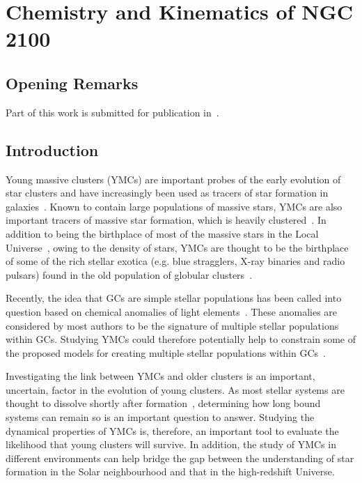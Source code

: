 \chapter{Chemistry and Kinematics of NGC\,2100}\label{ch:ngc2100}

\section{Opening Remarks} %
\label{sec:opening_remarks}

Part of this work is submitted for publication in~\cite{2016arXiv160202702P}.

\section{Introduction} %
\label{sec:introduction}

Young massive clusters (YMCs\footnotemark) are important probes of the early evolution of star clusters and have increasingly been used as tracers of star formation in galaxies~\citep[e.g.][]{1995AJ....109..960W,1997AJ....114.2381M,1999AJ....118..752Z}.
Known to contain large populations of massive stars, YMCs are also important tracers of massive star formation, which is heavily clustered~\citep{2003ARA&A..41...57L,2005A&A...437..247D,2007MNRAS.380.1271P}.
In addition to being the birthplace of most of the massive stars in the Local Universe~\citep[$>200\,$M$_{\odot}$ stars in R136;][]{2010MNRAS.408..731C}, owing to the density of stars, YMCs are thought to be the birthplace of some of the rich stellar exotica
(e.g. blue stragglers, X-ray binaries and radio pulsars) found in the old population of globular clusters~\citep[GCs;][]{2010ARA&A..48..431P}.


Recently, the idea that GCs are simple stellar populations has been called into question based on chemical anomalies of light elements~\citep[C, N, O, Na and Al; e.g.][]{2012A&ARv..20...50G}.
These anomalies are considered by most authors to be the signature of multiple stellar populations within GCs.
Studying YMCs could therefore potentially help to constrain some of the proposed models for creating multiple stellar populations within GCs~\citep[e.g.][]{2014MNRAS.441.2754C}.

Investigating the link between YMCs and older clusters is an important, uncertain, factor in the evolution of young clusters.
As most stellar systems are thought to dissolve shortly after formation~\citep{2003ARA&A..41...57L}, determining how long bound systems can remain so is an important question to answer.
Studying the dynamical properties of YMCs is, therefore, an important tool to evaluate the likelihood that young clusters will survive.
In addition, the study of YMCs in different environments can help bridge the gap between the understanding of star formation in the Solar neighbourhood and that in the high-redshift Universe.


